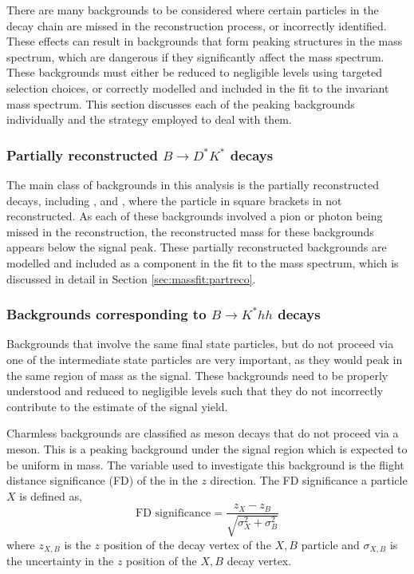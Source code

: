 There are many backgrounds to be considered where certain particles in the decay chain are missed in the reconstruction process, or incorrectly identified. These effects can result in backgrounds that form peaking structures in the \Bm mass spectrum, which are dangerous if they significantly affect the \Bm mass spectrum. These backgrounds must either be reduced to negligible levels using targeted selection choices, or correctly modelled and included in the fit to the invariant \Bm mass spectrum. This section discusses each of the peaking backgrounds individually and the strategy employed to deal with them.

\subsubsection{Partially reconstructed \boldmath$B \to D^*K^*$ decays}
\label{sec:backgrounds:partreco}

The main class of backgrounds in this analysis is the partially reconstructed \decay{\B}{\Dstar\Kstar} decays, including \decay{\Bm}{(\decay{\Dstarz}{\Dz[\piz]})\Kstarm}, \decay{\Bm}{(\decay{\Dstarz}{\Dz[\gamma]})\Kstarm} and \decay{\Bd}{(\decay{\Dstarp}{\Dz[\pip]})\Kstarm}, where the particle in square brackets in not reconstructed. As each of these backgrounds involved a pion or photon being missed in the reconstruction, the reconstructed \Bm mass for these backgrounds appears below the signal peak. These partially reconstructed backgrounds are modelled and included as a component in the fit to the \Bm mass spectrum, which is discussed in detail in Section \ref{sec:massfit:partreco}.

\subsubsection{Backgrounds corresponding to \boldmath$B \to K^*hh$ decays}
\label{sec:backgrounds:charmless}

Backgrounds that involve the same final state particles, but do not proceed via one of the intermediate state particles are very important, as they would peak in the same region of \Bm mass as the signal. These backgrounds need to be properly understood and reduced to negligible levels such that they do not incorrectly contribute to the estimate of the signal yield. 

Charmless backgrounds are classified as \Bm meson decays that do not proceed via a \Dz meson. This is a peaking background under the signal region which is expected to be uniform in \Dz mass. The variable used to investigate this background is the flight distance significance (FD) of the \Dz in the $z$ direction. The FD significance a particle $X$ is defined as, 
\begin{equation}
\text{FD significance} = \frac{z_X - z_B}{\sqrt{\sigma_X^2 + \sigma_B^2}}
\label{FDdefinition}
\end{equation}
where $z_{X,B}$ is the $z$ position of the decay vertex of the $X,B$ particle and $\sigma_{X,B}$ is the uncertainty in the $z$ position of the $X,B$ decay vertex.

